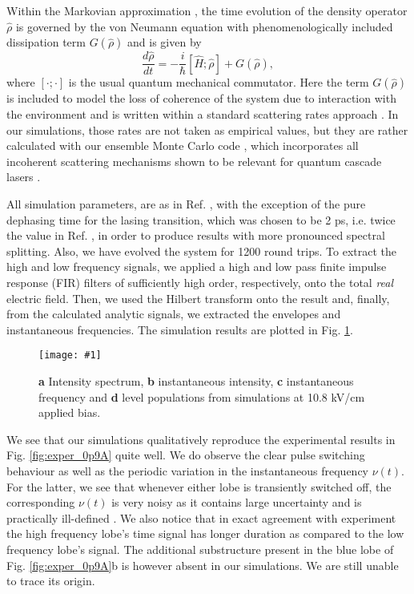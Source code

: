 \documentclass[]{spie}  %
\newcommand{\includegraphicsXL}[1]{\texttt{[image: \#1]}}
\def\h{\hat}
\def\h{\hat}
\begin{document}
Within the Markovian approximation \cite{knezevic2013time}, the time evolution of the density operator $\h{\rho}$ is governed by the von Neumann equation with phenomenologically included dissipation term $G(\h{\rho})$ and is given by
\begin{equation}
\label{eq:vonNeumann}
\frac{d \h\rho}{dt} = -\frac{i}{\hbar}[\h H;\h\rho] + G(\h{\rho}),
\end{equation}
where $[\cdot;\cdot]$ is the usual quantum mechanical commutator. Here the term $G(\h{\rho})$ is included to model the loss of coherence of the system due to interaction with the environment and is written within a standard scattering rates approach \cite{iotti2005microscopic}. In our simulations, those rates are not taken as empirical values, but they are rather calculated with our ensemble Monte Carlo code \cite{jirauschek2014modeling}, which incorporates all incoherent scattering mechanisms shown to be relevant for quantum cascade lasers \cite{jirauschek2009monte,jirauschek2010monte,jirauschek2010monte_2}. 

All simulation parameters, are as in Ref. , with the exception of the pure dephasing time for the lasing transition, which was chosen to be 2 ps, i.e. twice the value in Ref. , in order to produce results with more pronounced spectral splitting. Also, we have evolved the system for 1200 round trips. To extract the high and low frequency signals, we applied a high and low pass finite impulse response (FIR) filters of sufficiently high order, respectively, onto the total \emph{real} electric field. Then, we used the Hilbert transform onto the result and, finally, from the calculated analytic signals, we extracted the envelopes and instantaneous frequencies. The simulation results are plotted in Fig. \ref{fig:sim_10p8}.

\begin{figure}[h!]
	\begin{center}
		\includegraphicsXL{IMGS/sim_10p8.eps}
		\caption{ \textbf{a} Intensity spectrum, \textbf{b} instantaneous intensity, \textbf{c} instantaneous frequency and \textbf{d} level populations from simulations at 10.8 kV/cm applied bias.} \label{fig:sim_10p8}
	\end{center}	
\end{figure}

We see that our simulations qualitatively reproduce the experimental results in Fig. \ref{fig:exper_0p9A} quite well. We do observe the clear pulse switching behaviour as well as the periodic variation in the instantaneous frequency $\nu(t)$. For the latter, we see that whenever either lobe is transiently switched off, the corresponding $\nu(t)$ is very noisy as it contains large uncertainty and is practically ill-defined \cite{burghoff2014broadband}. We also notice that in exact agreement with experiment the high frequency lobe's time signal has longer duration as compared to the low frequency lobe's signal. The additional substructure present in the blue lobe of Fig. \ref{fig:exper_0p9A}b is however absent in our simulations. We are still unable to trace its origin. 
\end{document}
